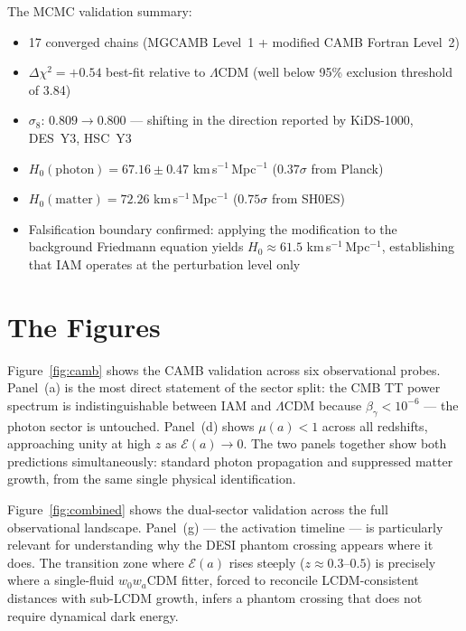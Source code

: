 \documentclass[12pt]{article}
\begin{document}
\vspace{4pt}

The MCMC validation summary:
\begin{itemize}
\item 17 converged chains (MGCAMB Level~1 + modified CAMB Fortran Level~2)
\item $\Delta\chi^2 = +0.54$ best-fit relative to $\Lambda$CDM (well below
  95\% exclusion threshold of 3.84)
\item $\sigma_8$: $0.809 \to 0.800$ — shifting in the direction reported
  by KiDS-1000, DES~Y3, HSC~Y3
\item $H_0(\mathrm{photon}) = 67.16 \pm 0.47$ km\,s$^{-1}$\,Mpc$^{-1}$
  ($0.37\sigma$ from Planck)
\item $H_0(\mathrm{matter}) = 72.26$ km\,s$^{-1}$\,Mpc$^{-1}$
  ($0.75\sigma$ from SH0ES)
\item Falsification boundary confirmed: applying the modification to
  the background Friedmann equation yields $H_0 \approx 61.5$
  km\,s$^{-1}$\,Mpc$^{-1}$, establishing that IAM operates
  at the perturbation level only
\end{itemize}


\section{The Figures}

Figure~\ref{fig:camb} shows the CAMB validation across six observational
probes. Panel~(a) is the most direct statement of the sector split: the
CMB TT power spectrum is indistinguishable between IAM and $\Lambda$CDM
because $\beta_\gamma < 10^{-6}$ — the photon sector is untouched.
Panel~(d) shows $\mu(a) < 1$ across all redshifts, approaching unity
at high $z$ as $\mathcal{E}(a) \to 0$. The two panels together show
both predictions simultaneously: standard photon propagation and
suppressed matter growth, from the same single physical identification.

Figure~\ref{fig:combined} shows the dual-sector validation across the
full observational landscape. Panel~(g) — the activation timeline — is
particularly relevant for understanding why the DESI phantom crossing
appears where it does. The transition zone where $\mathcal{E}(a)$ rises
steeply ($z \approx 0.3$--$0.5$) is precisely where a single-fluid
$w_0 w_a$CDM fitter, forced to reconcile LCDM-consistent distances with
sub-LCDM growth, infers a phantom crossing that does not require
dynamical dark energy.
\end{document}
